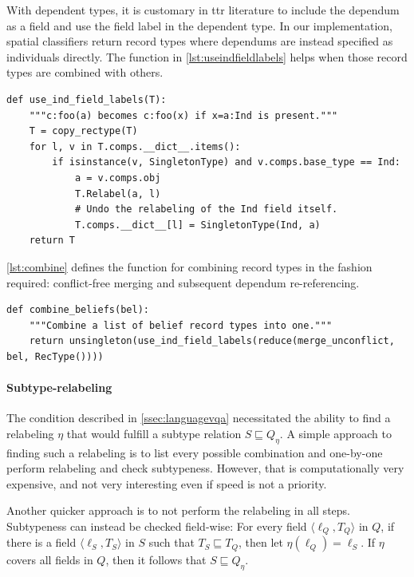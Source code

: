 With dependent types, it is customary in \gls{ttr} literature to include the dependum as a field and use the field label in the dependent type.
In our implementation, spatial classifiers return record types where dependums are instead specified as individuals directly.
The function in \autoref{lst:useindfieldlabels} helps when those record types are combined with others.

\begin{lstlisting}[label={lst:useindfieldlabels},caption={use\_ind\_field\_labels}]
def use_ind_field_labels(T):
    """c:foo(a) becomes c:foo(x) if x=a:Ind is present."""
    T = copy_rectype(T)
    for l, v in T.comps.__dict__.items():
        if isinstance(v, SingletonType) and v.comps.base_type == Ind:
            a = v.comps.obj
            T.Relabel(a, l)
            # Undo the relabeling of the Ind field itself.
            T.comps.__dict__[l] = SingletonType(Ind, a)
    return T
\end{lstlisting}

\autoref{lst:combine} defines the function for combining record types in the fashion required: conflict-free merging and subsequent dependum re-referencing.

\begin{lstlisting}[label={lst:combine},caption={combine}]
def combine_beliefs(bel):
    """Combine a list of belief record types into one."""
    return unsingleton(use_ind_field_labels(reduce(merge_unconflict, bel, RecType())))
\end{lstlisting}

\paragraph{Subtype-relabeling}

The condition described in \autoref{ssec:languagevqa} necessitated the ability to find a relabeling $\eta$ that would fulfill a subtype relation $S \sqsubseteq Q_\eta$.
A simple approach to finding such a relabeling is to list every possible combination and one-by-one perform relabeling and check subtypeness.
However, that is computationally very expensive, and not very interesting even if speed is not a priority.

Another quicker approach is to not perform the relabeling in all steps.
Subtypeness can instead be checked field-wise:
For every field $\langle\ell_Q, T_Q\rangle$ in $Q$, if there is a field $\langle\ell_S, T_S\rangle$ in $S$ such that $T_S \sqsubseteq T_Q$, then let $\eta(\ell_Q) = \ell_S$.
If $\eta$ covers all fields in $Q$, then it follows that $S \sqsubseteq Q_\eta$.

